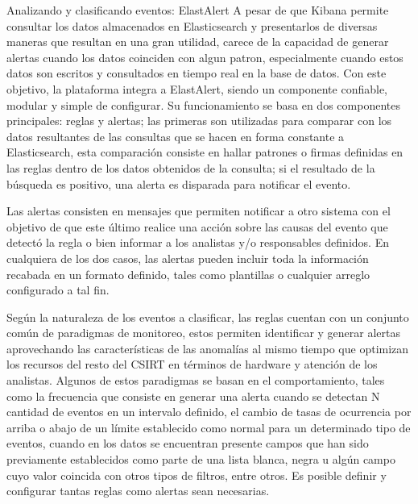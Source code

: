    \begin{section}{Analizando y clasificando eventos: ElastAlert}
     A pesar de que Kibana permite consultar los datos almacenados en Elasticsearch y presentarlos de diversas maneras que resultan en una gran utilidad, carece de la capacidad de generar alertas cuando los datos coinciden con algun patron, especialmente cuando estos datos son escritos y consultados en tiempo real en la base de datos. Con este objetivo, la plataforma integra a ElastAlert, siendo un componente confiable, modular y simple de configurar. Su funcionamiento se basa en dos componentes principales: reglas y alertas; las primeras son utilizadas para comparar con los datos resultantes de las consultas que se hacen en forma constante a Elasticsearch, esta comparación consiste en hallar patrones o firmas definidas en las reglas dentro de los datos obtenidos de la consulta; si el resultado de la búsqueda es positivo, una alerta es disparada para notificar el evento. \par
     Las alertas consisten en mensajes que permiten notificar a otro sistema con el objetivo de que este último realice una acción sobre las causas del evento que detectó la regla o bien informar a los analistas y/o responsables definidos. En cualquiera de los dos casos, las alertas pueden incluir toda la información recabada en un formato definido, tales como plantillas o cualquier arreglo configurado a tal fin. \par
     Según la naturaleza de los eventos a clasificar, las reglas cuentan con un conjunto común de paradigmas de monitoreo, estos permiten identificar y generar alertas aprovechando las características de las anomalías al mismo tiempo que optimizan los recursos del resto del CSIRT en términos de hardware y atención de los analistas. Algunos de estos paradigmas se basan en el comportamiento, tales como la frecuencia que consiste en generar una alerta cuando se detectan N cantidad de eventos en un intervalo definido, el cambio de tasas de ocurrencia por arriba o abajo de un límite establecido como normal para un determinado tipo de eventos, cuando en los datos se encuentran presente campos que han sido previamente establecidos como parte de una lista blanca, negra u algún campo cuyo valor coincida con otros tipos de filtros, entre otros. Es posible definir y configurar tantas reglas como alertas sean necesarias. \par

   \end{section}
   \pagebreak
